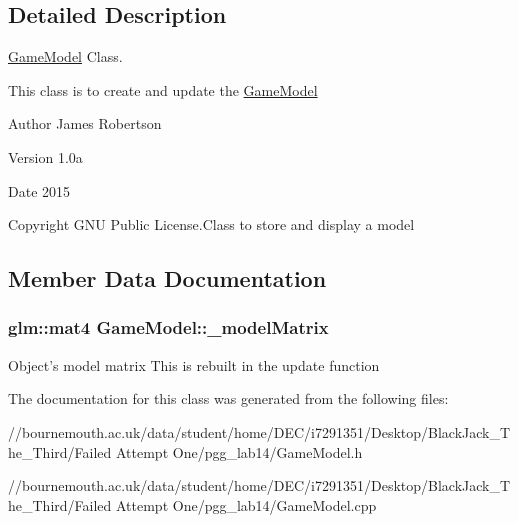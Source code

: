 \subsection{Detailed Description}
\hyperlink{class_game_model}{Game\+Model} Class. 

This class is to create and update the \hyperlink{class_game_model}{Game\+Model} \begin{DoxyAuthor}{Author}
James Robertson 
\end{DoxyAuthor}
\begin{DoxyVersion}{Version}
1.\+0a 
\end{DoxyVersion}
\begin{DoxyDate}{Date}
2015 
\end{DoxyDate}
\begin{DoxyCopyright}{Copyright}
G\+N\+U Public License.\+Class to store and display a model 
\end{DoxyCopyright}


\subsection{Member Data Documentation}
\hypertarget{class_game_model_a0196cbf5e8a2c20a5aed14f8d044b8e4}{
\subsubsection[{\+\_\+model\+Matrix}]{\setlength{\rightskip}{0pt plus 5cm}glm\+::mat4 Game\+Model\+::\+\_\+model\+Matrix\hspace{0.3cm}{\ttfamily [protected]}}}\label{class_game_model_a0196cbf5e8a2c20a5aed14f8d044b8e4}
Object's model matrix This is rebuilt in the update function 

The documentation for this class was generated from the following files\+:\begin{DoxyCompactItemize}
\item 
//bournemouth.\+ac.\+uk/data/student/home/\+D\+E\+C/i7291351/\+Desktop/\+Black\+Jack\+\_\+\+The\+\_\+\+Third/\+Failed Attempt One/pgg\+\_\+lab14/Game\+Model.\+h\item 
//bournemouth.\+ac.\+uk/data/student/home/\+D\+E\+C/i7291351/\+Desktop/\+Black\+Jack\+\_\+\+The\+\_\+\+Third/\+Failed Attempt One/pgg\+\_\+lab14/Game\+Model.\+cpp\end{DoxyCompactItemize}
